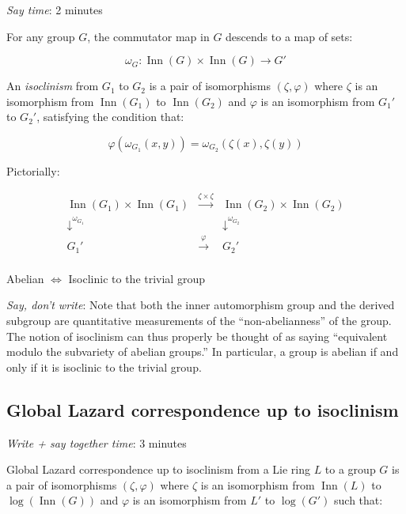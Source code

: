 \documentclass[10pt]{amsart}
\begin{document}
{\em Say time}: 2 minutes

For any group $G$, the commutator map in $G$ descends to a map of sets:

$$\omega_G: \operatorname{Inn}(G) \times \operatorname{Inn}(G) \to G'$$

An {\em isoclinism} from $G_1$ to $G_2$ is a pair of isomorphisms
$(\zeta,\varphi)$ where $\zeta$ is an isomorphism from
$\operatorname{Inn}(G_1)$ to $\operatorname{Inn}(G_2)$ and $\varphi$ is an
isomorphism from $G_1'$ to $G_2'$, satisfying the condition that:

\begin{equation}\label{eq:homoclinism-pointed}
  \varphi(\omega_{G_1}(x,y)) = \omega_{G_2}(\zeta(x),\zeta(y))
\end{equation}

Pictorially:

$$\begin{array}{ccc}
  \operatorname{Inn}(G_1) \times \operatorname{Inn}(G_1) & \stackrel{\zeta \times \zeta}{\to} & \operatorname{Inn}(G_2) \times \operatorname{Inn}(G_2) \\
  \downarrow^{\omega_{G_1}}  & & \downarrow^{\omega_{G_2}}\\
  G_1' & \stackrel{\varphi}{\to} & G_2'\\
\end{array}$$

Abelian $\iff$ Isoclinic to the trivial group

{\em Say, don't write}: Note that both the inner automorphism group
and the derived subgroup are quantitative measurements of the
``non-abelianness'' of the group. The notion of isoclinism can thus
properly be thought of as saying ``equivalent modulo the subvariety of
abelian groups.'' In particular, a group is abelian if and only if it
is isoclinic to the trivial group.

\subsection{Global Lazard correspondence up to isoclinism}

{\em Write + say together time}: 3 minutes

Global Lazard correspondence up to isoclinism from a Lie ring $L$ to a
group $G$ is a pair of isomorphisms $(\zeta,\varphi)$ where $\zeta$ is
an isomorphism from $\operatorname{Inn}(L)$ to
$\log(\operatorname{Inn}(G))$ and $\varphi$ is an isomorphism from
$L'$ to $\log(G')$ such that:
\end{document}
